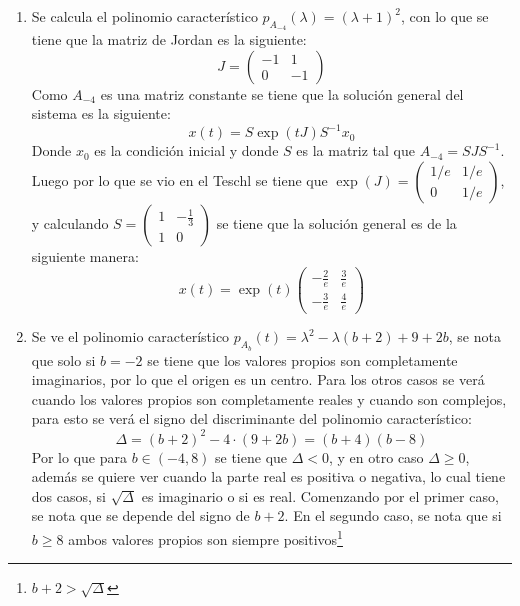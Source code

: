 \documentclass{homework}
\begin{document}
\begin{sol}
    \begin{enumerate}[label=(\alph*)]
        \item Se calcula el polinomio característico \( p_{A_{-4}}(\lambda)=(\lambda+1)^2\), con lo que se tiene que la matriz de Jordan es la siguiente:
        \[J=\begin{pmatrix}
            -1&1\\0&-1
        \end{pmatrix}\]
        Como \(A_{-4}\) es una matriz constante se tiene que la solución general del sistema es la siguiente:
        \[x(t)=S\exp(tJ)S^{-1}x_0\]
        Donde \(x_0\) es la condición inicial y donde \(S\) es la matriz tal que \(A_{-4}=SJS^{-1}\). Luego por lo que se vio en el Teschl se tiene que \(\exp(J)=\begin{pmatrix}
            1/e&1/e\\0&1/e
        \end{pmatrix}\), y calculando \(S=\begin{pmatrix}
            1&-\frac13\\1&0
        \end{pmatrix}\) se tiene que la solución general es de la siguiente manera:
        \begin{equation*}
            x(t)=\exp(t)\begin{pmatrix}
                -\frac2e&\frac3e\\-\frac3e&\frac4e
            \end{pmatrix}
        \end{equation*}
        \item Se ve el polinomio característico \(p_{A_b}(t)=\lambda^2-\lambda(b+2)+9+2b\), se nota que solo si \(b=-2\) se tiene que los valores propios son completamente imaginarios, por lo que el origen es un centro. Para los otros casos se verá cuando los valores propios son completamente reales y cuando son complejos, para esto se verá el signo del discriminante del polinomio característico:
        \begin{equation*}
            \Delta=(b+2)^2-4\cdot(9+2b)=(b+4)(b-8)
        \end{equation*}
        Por lo que para \(b\in(-4,8)\) se tiene que \(\Delta<0\), y en otro caso \(\Delta\geq0\), además se quiere ver cuando la parte real es positiva o negativa, lo cual tiene dos casos, si \(\sqrt{\Delta}\) es imaginario o si es real. Comenzando por el primer caso, se nota que se depende del signo de \(b+2\). En el segundo caso, se nota que si \(b\geq 8\) ambos valores propios son siempre positivos\footnote{\(b+2>\sqrt{\Delta}\)}
    \end{enumerate}
\end{sol}
\end{document}
